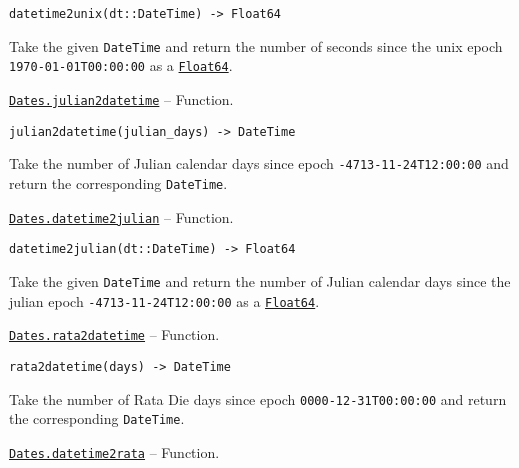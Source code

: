 \begin{adjustwidth}{2em}{0pt}


\begin{verbatim}
datetime2unix(dt::DateTime) -> Float64
\end{verbatim}

Take the given \texttt{DateTime} and return the number of seconds since the unix epoch \texttt{1970-01-01T00:00:00} as a \hyperlink{5027751419500983000}{\texttt{Float64}}.



\end{adjustwidth}
\hypertarget{2031899596964007680}{} 
\hyperlink{2031899596964007680}{\texttt{Dates.julian2datetime}}  -- {Function.}

\begin{adjustwidth}{2em}{0pt}


\begin{verbatim}
julian2datetime(julian_days) -> DateTime
\end{verbatim}

Take the number of Julian calendar days since epoch \texttt{-4713-11-24T12:00:00} and return the corresponding \texttt{DateTime}.



\end{adjustwidth}
\hypertarget{11675145653043813028}{} 
\hyperlink{11675145653043813028}{\texttt{Dates.datetime2julian}}  -- {Function.}

\begin{adjustwidth}{2em}{0pt}


\begin{verbatim}
datetime2julian(dt::DateTime) -> Float64
\end{verbatim}

Take the given \texttt{DateTime} and return the number of Julian calendar days since the julian epoch \texttt{-4713-11-24T12:00:00} as a \hyperlink{5027751419500983000}{\texttt{Float64}}.



\end{adjustwidth}
\hypertarget{13618878841813439465}{} 
\hyperlink{13618878841813439465}{\texttt{Dates.rata2datetime}}  -- {Function.}

\begin{adjustwidth}{2em}{0pt}


\begin{verbatim}
rata2datetime(days) -> DateTime
\end{verbatim}

Take the number of Rata Die days since epoch \texttt{0000-12-31T00:00:00} and return the corresponding \texttt{DateTime}.



\end{adjustwidth}
\hypertarget{4095235562821247460}{} 
\hyperlink{4095235562821247460}{\texttt{Dates.datetime2rata}}  -- {Function.}

